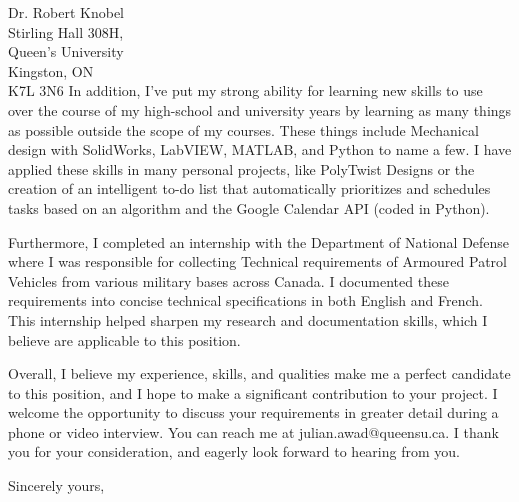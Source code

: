 \documentclass[11pt]{letter} %
\begin{document}
\begin{letter}{Dr. Robert Knobel \\
Stirling Hall 308H, \\
Queen's University \\
Kingston, ON \\
K7L 3N6}
In addition, I've put my strong ability for learning new skills to use over the course of my high-school and university years by learning as many things as possible outside the scope of my courses. These things include Mechanical design with SolidWorks, LabVIEW, MATLAB, and Python to name a few. I have applied these skills in many personal projects, like PolyTwist Designs or the creation of an intelligent to-do list that automatically prioritizes and schedules tasks based on an algorithm and the Google Calendar API (coded in Python).

Furthermore, I completed an internship with the Department of National Defense where I was responsible for collecting Technical requirements of Armoured Patrol Vehicles from various military bases across Canada. I documented these requirements into concise technical specifications in both English and French. This internship helped sharpen my research and documentation skills, which I believe are applicable to this position.

Overall, I believe my experience, skills, and qualities make me a perfect candidate to this position, and I hope to make a significant contribution to your project. I welcome the opportunity to discuss your requirements in greater detail during a phone or video interview. You can reach me at julian.awad@queensu.ca. I thank you for your consideration, and eagerly look forward to hearing from you.

\closing{Sincerely yours,}


\end{letter}
\end{document}
